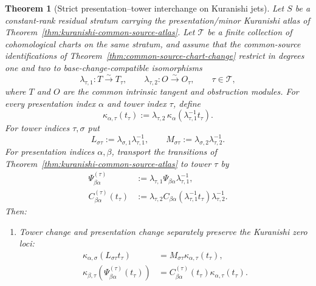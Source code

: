\documentclass[11pt]{article}
\newtheorem{theorem}{Theorem}[section]
\theoremstyle{definition}
\begin{document}
\begin{theorem}[Strict presentation--tower interchange on Kuranishi jets]\label{thm:kuranishi-presentation-tower-interchange}
Let $S$ be a constant-rank residual stratum carrying the presentation/minor
Kuranishi atlas of Theorem~\ref{thm:kuranishi-common-source-atlas}.  Let
$\mathcal T$ be a finite collection of cohomological charts on the same
stratum, and assume that the common-source identifications of
Theorem~\ref{thm:common-source-chart-change} restrict in degrees one and two to
base-change-compatible isomorphisms
\[
 \lambda_{\tau,1}:T\xrightarrow{\sim}T_\tau,
 \qquad
 \lambda_{\tau,2}:O\xrightarrow{\sim}O_\tau,
 \qquad \tau\in\mathcal T,
\]
where $T$ and $O$ are the common intrinsic tangent and obstruction modules.
For every presentation index $\alpha$ and tower index $\tau$, define
\begin{equation}\label{eq:presentation-tower-kuranishi-chart}
 \kappa_{\alpha,\tau}(t_\tau)
 :=\lambda_{\tau,2}\,
   \kappa_\alpha\!\left(\lambda_{\tau,1}^{-1}t_\tau\right).
\end{equation}
For tower indices $\tau,\sigma$ put
\begin{equation}\label{eq:kuranishi-tower-linear-transitions}
 L_{\sigma\tau}:=\lambda_{\sigma,1}\lambda_{\tau,1}^{-1},
 \qquad
 M_{\sigma\tau}:=\lambda_{\sigma,2}\lambda_{\tau,2}^{-1}.
\end{equation}
For presentation indices $\alpha,\beta$, transport the transitions of
Theorem~\ref{thm:kuranishi-common-source-atlas} to tower $\tau$ by
\begin{align}
 \Psi^{(\tau)}_{\beta\alpha}
 &:=\lambda_{\tau,1}\Psi_{\beta\alpha}\lambda_{\tau,1}^{-1},
 \label{eq:kuranishi-presentation-transition-in-tower}\\
 C^{(\tau)}_{\beta\alpha}(t_\tau)
 &:=\lambda_{\tau,2}
 C_{\beta\alpha}\!\left(\lambda_{\tau,1}^{-1}t_\tau\right)
 \lambda_{\tau,2}^{-1}.
 \label{eq:kuranishi-obstruction-transition-in-tower}
\end{align}
Then:
\begin{enumerate}[label=\textnormal{(\roman*)}]
\item Tower change and presentation change separately preserve the Kuranishi
zero loci:
\begin{align}
 \kappa_{\alpha,\sigma}(L_{\sigma\tau}t_\tau)
 &=M_{\sigma\tau}\kappa_{\alpha,\tau}(t_\tau),
 \label{eq:kuranishi-tower-gauge-equivalence}\\
 \kappa_{\beta,\tau}(\Psi^{(\tau)}_{\beta\alpha}(t_\tau))
 &=C^{(\tau)}_{\beta\alpha}(t_\tau)
   \kappa_{\alpha,\tau}(t_\tau).
 \label{eq:kuranishi-presentation-gauge-equivalence-in-tower}
\end{align}


\end{enumerate}
\end{theorem}
\end{document}
